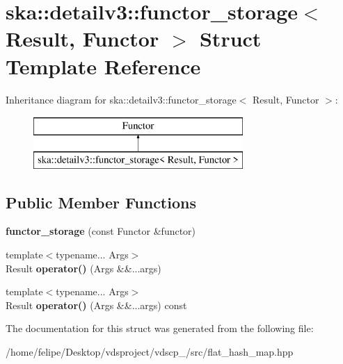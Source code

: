 \section{ska\+:\+:detailv3\+:\+:functor\+\_\+storage$<$ Result, Functor $>$ Struct Template Reference}
\label{structska_1_1detailv3_1_1functor__storage}
Inheritance diagram for ska\+:\+:detailv3\+:\+:functor\+\_\+storage$<$ Result, Functor $>$\+:\begin{figure}[H]
\begin{center}
\leavevmode
\includegraphics[height=2.000000cm]{structska_1_1detailv3_1_1functor__storage}
\end{center}
\end{figure}
\subsection*{Public Member Functions}
\begin{DoxyCompactItemize}
\item 
{\bfseries functor\+\_\+storage} (const Functor \&functor)\label{structska_1_1detailv3_1_1functor__storage_a5e4eb7609b4baf949e46c598e255e2d2}

\item 
{\footnotesize template$<$typename... Args$>$ }\\Result {\bfseries operator()} (Args \&\&...args)\label{structska_1_1detailv3_1_1functor__storage_a024a67f954462da36d97466dacfe9128}

\item 
{\footnotesize template$<$typename... Args$>$ }\\Result {\bfseries operator()} (Args \&\&...args) const \label{structska_1_1detailv3_1_1functor__storage_a3bbebb63a713a5eedd4acb3d55f6ffc4}

\end{DoxyCompactItemize}


The documentation for this struct was generated from the following file\+:\begin{DoxyCompactItemize}
\item 
/home/felipe/\+Desktop/vdsproject/vdscp\+\_/src/flat\+\_\+hash\+\_\+map.\+hpp\end{DoxyCompactItemize}
